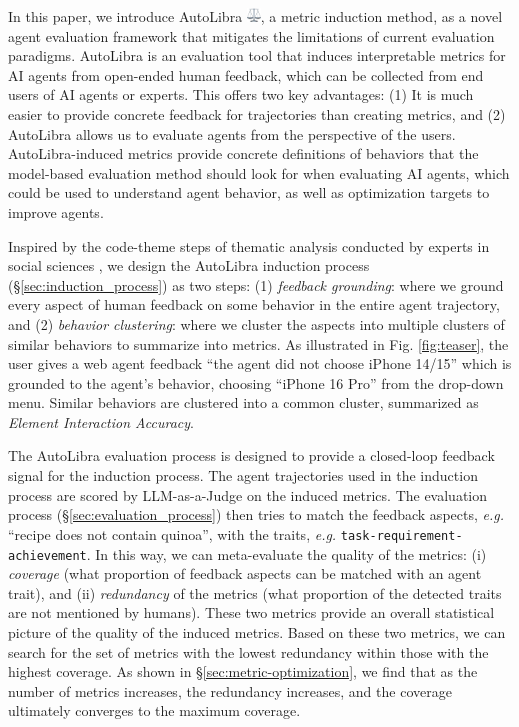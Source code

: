 In this paper, we introduce AutoLibra \protect\includegraphics[height=1em]{figs/scale.png},
a metric induction method, as a novel agent evaluation framework
that mitigates the limitations of current evaluation paradigms.
AutoLibra is an evaluation tool that induces interpretable metrics for AI agents
from open-ended human feedback, which can be collected
from end users of AI agents or experts. 
This offers two key advantages: (1) It is much easier to provide concrete feedback for trajectories than creating metrics, and (2) AutoLibra allows us to evaluate agents from the perspective of the users. 
AutoLibra-induced metrics provide concrete definitions of behaviors that the model-based evaluation method should look for
when evaluating AI agents, which could be used to understand agent behavior,
as well as optimization targets to improve agents.



Inspired by the code-theme steps of thematic analysis conducted by experts
in social sciences \citep{braun2006using},
we design the AutoLibra induction process (\S\ref{sec:induction_process}) as two steps:
(1) \emph{feedback grounding}: where we ground every aspect of human feedback on some behavior in the entire agent trajectory,
and (2) \emph{behavior clustering}: where we cluster the aspects into multiple clusters of similar behaviors to summarize into metrics. As illustrated in Fig. \ref{fig:teaser}, the user gives a web agent feedback ``the agent did not choose iPhone 14/15'' which is grounded to the agent's behavior, choosing ``iPhone 16 Pro'' from the drop-down menu. Similar behaviors are clustered into a common cluster, summarized as \textit{Element Interaction Accuracy}. 


The AutoLibra evaluation process is designed to provide a closed-loop feedback signal for the induction process. 
The agent trajectories used in the induction process are scored by LLM-as-a-Judge \citep{zheng2023judging}
on the induced metrics. The evaluation process (\S\ref{sec:evaluation_process}) then tries to match the feedback aspects,
\emph{e.g.} ``recipe does not contain quinoa'', with the traits, \emph{e.g.} \texttt{task-requirement-achievement}.
In this way, we can meta-evaluate the quality of the metrics: (i) \emph{coverage} (what proportion of feedback aspects can be matched with an agent trait), and (ii) \emph{redundancy} of the metrics
(what proportion of the detected traits are not mentioned by humans). These two metrics provide an overall statistical picture of the quality of the induced metrics. Based on these two metrics, we can search for the set of metrics with the lowest redundancy within those with the highest coverage. As shown in \S\ref{sec:metric-optimization}, we find that as the number of metrics increases, the redundancy increases, and the coverage ultimately converges to the maximum coverage.



